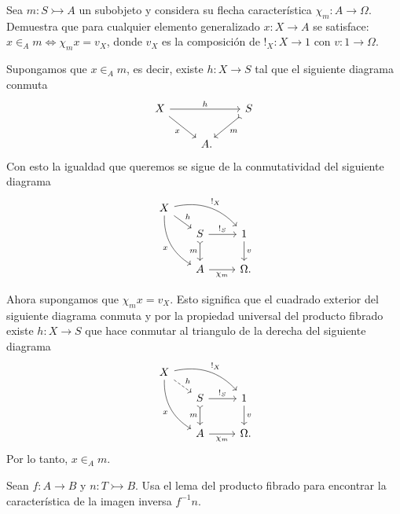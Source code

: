 \begin{exercise}[teca=1]
  Sea \(m\colon S\rightarrowtail A\) un subobjeto y considera su flecha
  característica \(\chi_m\colon A\to \Omega\). Demuestra que para
  cualquier elemento generalizado \(x\colon X\to A\) se satisface: \( x\in_A m \iff \chi_m x = v_X \), donde \(v_X\) es la composición de \(!_X\colon X\to 1\) con \(v\colon 1\to \Omega\).
\end{exercise}
\begin{solution}
  Supongamos que \(x\in_A m\), es decir, existe \(h\colon X\to S\) tal que
  el siguiente diagrama conmuta
  \begin{equation*}
    \begin{tikzcd}[ampersand replacement=\&]
      X\ar{rr}{h}\ar{dr}[swap]{x} \&\& S\ar[tail]{dl}{m}\\
      \& A\mathrlap{.}    
    \end{tikzcd}
  \end{equation*}
  Con esto la igualdad que queremos se sigue de la conmutatividad del siguiente
  diagrama
  \begin{equation*}
    \begin{tikzcd}[ampersand replacement=\&]
      X\ar[bend left=30]{rrd}{!_X}\ar{rd}{h}\ar[bend right=30]{ddr}[swap]{x}\\[-2ex]
      \&[-2ex] S\ar{r}{!_S}\ar[tail]{d}[swap]{m} \& 1\ar{d}{v}\\
      \& A\ar{r}[swap]{\chi_m} \& \Omega\mathrlap{.}
    \end{tikzcd}
  \end{equation*}

  Ahora supongamos que \(\chi_m x = v_X\). Esto significa que el cuadrado
  exterior del siguiente diagrama conmuta y por la propiedad universal del
  producto fibrado existe \(h\colon X\to S\) que hace conmutar al triangulo de
  la derecha del siguiente diagrama 
  \begin{equation*}
    \begin{tikzcd}[ampersand replacement=\&]
      X\ar[bend left=30]{rrd}{!_X}\ar[dashed]{rd}{h}\ar[bend right=30]{ddr}[swap]{x}\\[-2ex]
      \&[-2ex] S\ar{r}{!_S}\ar[tail]{d}[swap]{m} \& 1\ar{d}{v}\\
      \& A\ar{r}[swap]{\chi_m} \& \Omega\mathrlap{.}
    \end{tikzcd}
  \end{equation*}
  Por lo tanto, \(x\in_A m\).
\end{solution}

\begin{exercise}
  Sean \(f\colon A\to B\) y \(n\colon T\rightarrowtail B\). Usa el lema
  del producto fibrado para encontrar la característica de la imagen
  inversa \(f^{-1}n\).
\end{exercise}